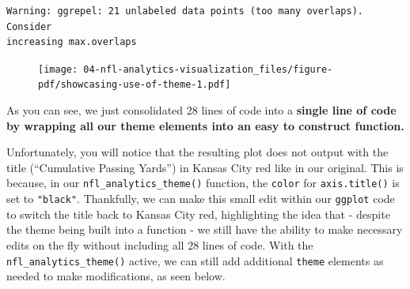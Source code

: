 \documentclass[
  letterpaper,
]{krantz}
\begin{document}
\begin{verbatim}
Warning: ggrepel: 21 unlabeled data points (too many overlaps). Consider
increasing max.overlaps
\end{verbatim}

\begin{figure}[H]

{\centering \texttt{[image: 04-nfl-analytics-visualization\_files/figure-pdf/showcasing-use-of-theme-1.pdf]}

}

\end{figure}

As you can see, we just consolidated 28 lines of code into a
\textbf{single line of code by wrapping all our theme elements into an
easy to construct function.}

Unfortunately, you will notice that the resulting plot does not output
with the title (``Cumulative Passing Yards'') in Kansas City red like in
our original. This is because, in our \texttt{nfl\_analytics\_theme()}
function, the \texttt{color} for \texttt{axis.title()} is set to
\texttt{"black"}. Thankfully, we can make this small edit within our
\texttt{ggplot} code to switch the title back to Kansas City red,
highlighting the idea that - despite the theme being built into a
function - we still have the ability to make necessary edits on the fly
without including all 28 lines of code. With the
\texttt{nfl\_analytics\_theme()} active, we can still add additional
\texttt{theme} elements as needed to make modifications, as seen below.
\end{document}
